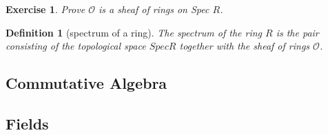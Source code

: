 \documentclass[12pt]{report}
\newtheorem{definition}[proposition]{Definition}
\newtheorem{ex}[proposition]{Exercise}
\begin{document}
\begin{ex}
	Prove $\mathscr{O}$ is a sheaf of rings on Spec $R$. 
\end{ex}			

\begin{definition}[spectrum of a ring]
	The spectrum of the ring $R$ is the pair consisting of the topological space $Spec R$ together with the sheaf of rings $\mathscr{O}$.
\end{definition}												

\begin{appendices}
	\addappheadtotoc
	
\chapter{Commutative Algebra}
\label{chap:commalg}

\section{Fields}
\label{sec:fields}
	
\end{appendices}						

		
\end{document}
